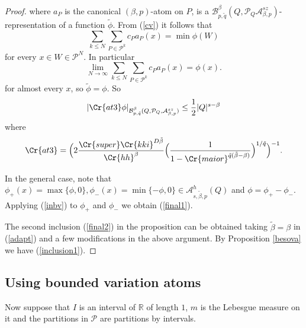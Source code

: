 \documentclass{amsart}
\theoremstyle{definition}
\newcommand{\Crr}[1]{\Cr{#1}}
\begin{document}
\begin{proof}
where $a_P$ is the canonical $(\beta,p)$-atom on $P$,  is a $\mathcal{B}^\beta_{p,\tilde{q}}(Q,\mathcal{P}_Q\mathcal{A}^{sz}_{\beta,p})$-representation of  a function $\tilde{\phi}$.  From (\ref{cv}) it follows that
$$\sum_{k\leq N} \sum_{P\in \mathcal{P}^k} c_P a_P(x)= \min \phi(W)$$
for every $x \in W\in \mathcal{P}^{N}.$ In particular
$$\lim_{N\rightarrow \infty} \sum_{k\leq N} \sum_{P\in \mathcal{P}^k} c_P a_P(x) =\phi(x).$$
for almost every $x$, so $\tilde{\phi}=\phi$. So
\begin{equation}\label{inbv} |\Crr{at3}\phi|_{\mathcal{B}^\beta_{p,\tilde{q}}(Q,\mathcal{P}_Q,\mathcal{A}^{sz}_{\beta,p})}\leq  \frac{1}{2} |Q|^{s-\beta}\end{equation} 
where
$$\Crr{at3}= \Big( 2\frac{\Crr{super} \Crr{kki}^{D\tilde{\beta}}}{\Crr{hh}^\beta} \Big(\frac{1}{1-\Crr{maior}^{\tilde{q}(\tilde{\beta}-\beta)}}\Big)^{1/\tilde{q}}\Big)^{-1}.$$

In the general case, note that $\phi_+(x)=\max\{ \phi,0\}, \phi_-(x)=\min\{-\phi,0\} \in \mathcal{A}^{h}_{s,\tilde{\beta},p}(Q)$ and $\phi=\phi_+-\phi_-$. Applying (\ref{inbv}) to $\phi_+$ and $\phi_-$ we obtain (\ref{final1}).

The second inclusion (\ref{final2}) in the proposition can be obtained taking $\tilde{\beta}=\beta$ in (\ref{adapt}) and a few modifications in the above argument.  By Proposition \ref{besova} we have (\ref{inclusion1}).
\end{proof}

\subsection{Using bounded variation atoms}  Now suppose that  $I$ is an interval of $\mathbb{R}$ of length $1$, $m$ is the Lebesgue measure on it and the partitions in $\mathcal{P}$ are partitions by intervals. 
\end{document}
